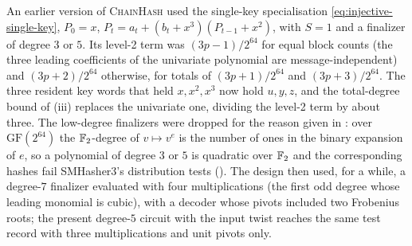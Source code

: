 \begin{remark}\label{rem:ph:single-key}
An earlier version of \textsc{ChainHash} used the single-key specialisation
\eqref{eq:injective-single-key}, $P_0=x$, $P_t=a_t+(b_t+x^3)(P_{t-1}+x^2)$,
with $S=1$ and a finalizer of degree $3$ or $5$.  Its level-2 term was
$(3p-1)/2^{64}$ for equal block counts (the three leading coefficients of the
univariate polynomial are message-independent) and $(3p+2)/2^{64}$ otherwise,
for totals of $(3p+1)/2^{64}$ and $(3p+3)/2^{64}$.  The three resident key
words that held $x,x^2,x^3$ now hold $u,y,z$, and the total-degree bound of
(iii) replaces the univariate one, dividing the
level-2 term by about three.  The low-degree finalizers were dropped for the
reason given in : over $\mathrm{GF}(2^{64})$ the
$\mathbb{F}_2$-degree of $v\mapsto v^e$ is the number of ones in the binary expansion
of $e$, so a polynomial of degree $3$ or $5$ is quadratic over $\mathbb{F}_2$ and the
corresponding hashes fail SMHasher3's distribution tests
().  The design then used, for a while, a degree-$7$
finalizer evaluated with four multiplications (the first odd degree whose
leading monomial is cubic), with a decoder whose pivots included two
Frobenius roots; the present degree-$5$ circuit with the input twist reaches
the same test record with three multiplications and unit pivots only.
\end{remark}

